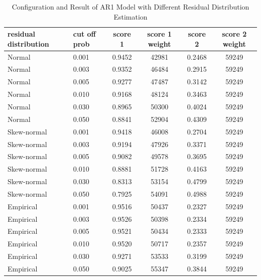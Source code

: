 \documentclass{article}
\begin{document}
\begin{table}[htbp]
  \begin{center}
    \caption{Configuration and Result of AR1 Model with Different Residual Distribution Estimation}
    \label{tab:tab1.3.2}
    \begin{tabular}{l|l|*{4}{c}}
      \textbf{residual distribution} & \textbf{cut off prob} & \textbf{score 1} & \textbf{score 1 weight} & \textbf{score 2} & \textbf{score 2 weight} \\
      \hline
      Normal & 0.001 & 0.9452 & 42981 & 0.2468 & 59249\\
      Normal & 0.003 & 0.9352 & 46484 & 0.2915 & 59249\\
      Normal & 0.005 & 0.9277 & 47487 & 0.3142 & 59249\\
      Normal & 0.010 & 0.9168 & 48124 & 0.3463 & 59249\\
      Normal & 0.030 & 0.8965 & 50300 & 0.4024 & 59249\\
      Normal & 0.050 & 0.8841 & 52904 & 0.4309 & 59249\\
      Skew-normal & 0.001 & 0.9418 & 46008 & 0.2704 & 59249\\
      Skew-normal & 0.003 & 0.9194 & 47926 & 0.3371 & 59249\\
      Skew-normal & 0.005 & 0.9082 & 49578 & 0.3695 & 59249\\
      Skew-normal & 0.010 & 0.8881 & 51728 & 0.4163 & 59249\\
      Skew-normal & 0.030 & 0.8313 & 53154 & 0.4799 & 59249\\
      Skew-normal & 0.050 & 0.7925 & 54091 & 0.4988 & 59249\\
      Empirical & 0.001 & 0.9516 & 50437 & 0.2327 & 59249\\
      Empirical & 0.003 & 0.9526 & 50398 & 0.2334 & 59249\\
      Empirical & 0.005 & 0.9521 & 50434 & 0.2333 & 59249\\
      Empirical & 0.010 & 0.9520 & 50717 & 0.2357 & 59249\\
      Empirical & 0.030 & 0.9271 & 53533 & 0.3199 & 59249\\
      Empirical & 0.050 & 0.9025 & 55347 & 0.3844 & 59249\\
    \end{tabular}
  \end{center}
\end{table}
\end{document}
